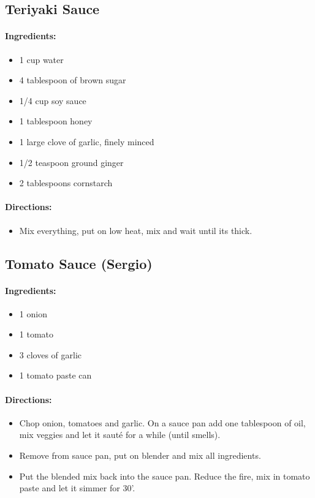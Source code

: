 \documentclass{article}
\begin{document}
\subsection{Teriyaki Sauce}

\paragraph{Ingredients:}
\begin{itemize}
    \item 1 cup water
    \item 4 tablespoon of brown sugar
    \item 1/4 cup soy sauce
    \item 1 tablespoon honey
    \item 1 large clove of garlic, finely minced
    \item 1/2 teaspoon ground ginger
    \item 2 tablespoons cornstarch
\end{itemize}

\paragraph{Directions:}
\begin{itemize}
    \item Mix everything, put on low heat, mix and wait until its thick.
\end{itemize}

\subsection{Tomato Sauce (Sergio)}

\paragraph{Ingredients:}
\begin{itemize}
    \item 1 onion
    \item 1 tomato
    \item 3 cloves of garlic
    \item 1 tomato paste can
\end{itemize}

\paragraph{Directions:}
\begin{itemize}
    \item Chop onion, tomatoes and garlic. On a sauce pan add one tablespoon of oil, mix veggies and let it sauté for a while (until smells).
    \item Remove from sauce pan, put on blender and mix all ingredients.
    \item Put the blended mix back into the sauce pan. Reduce the fire, mix in tomato paste and let it simmer for 30'.
\end{itemize}
\end{document}
